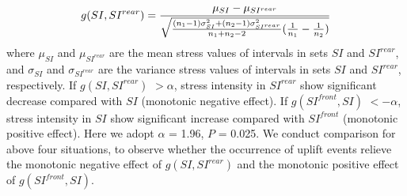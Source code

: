 \begin{equation}
\small{g(SI,SI^{rear})}= \frac{\mu_{SI}-\mu_{SI^{rear}}}{\sqrt{\frac{(n_1-1)\sigma^2_{SI}+(n_2-1)\sigma^2_{SI^{rear}}}{n_1+n_2-2}(\frac{1}{n_1}-\frac{1}{n_2})}}
\end{equation}
where $\mu_{SI}$ and $\mu_{SI^{rear}}$ are the mean stress values of intervals in sets $SI$ and $SI^{rear}$,
and $\sigma_{SI}$ and $\sigma_{SI^{rear}}$ are the variance stress values of intervals in sets $SI$ and $SI^{rear}$, respectively.
If $g(SI,SI^{rear})$ $> \alpha$, stress intensity in $SI^{rear}$ show significant decrease compared with $SI$ (monotonic negative effect).
If $g(SI^{front},SI)$ $< -\alpha$, stress intensity in $SI$ show significant increase compared with $SI^{front}$ (monotonic positive effect).
Here we adopt $\alpha$ = 1.96, $P$ = 0.025.
We conduct comparison for above four situations,
to observe whether the occurrence of uplift events relieve the monotonic negative effect of $g(SI,SI^{rear})$
and the monotonic positive effect of $g(SI^{front},SI)$.

%
%
